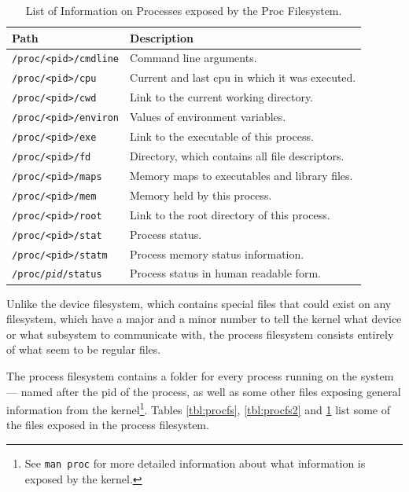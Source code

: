 \documentclass[a4paper]{article}
\begin{document}
\begin{table}
\renewcommand{\arraystretch}{1.25}
\centering
\caption{List of Information on Processes exposed by the Proc Filesystem.}  
\label{tbl:procfs3}
\begin{tabular}{@{}lp{8cm}@{}}
\toprule
Path & Description\\
\midrule
\texttt{/proc/<pid>/cmdline} &
Command line arguments.\\

\texttt{/proc/<pid>/cpu} &
Current and last cpu in which it was executed.\\

\texttt{/proc/<pid>/cwd} &
Link to the current working directory.\\

\texttt{/proc/<pid>/environ} &
Values of environment variables.\\

\texttt{/proc/<pid>/exe} &
Link to the executable of this process.\\

\texttt{/proc/<pid>/fd} &
Directory, which contains all file descriptors.\\

\texttt{/proc/<pid>/maps} &
Memory maps to executables and library files.\\

\texttt{/proc/<pid>/mem} &
Memory held by this process.\\

\texttt{/proc/<pid>/root} &
Link to the root directory of this process.\\

\texttt{/proc/<pid>/stat} &
Process status.\\

\texttt{/proc/<pid>/statm} &
Process memory status information.\\

\texttt{/proc/\emph{pid}/status} &
Process status in human readable form.\\
\bottomrule
\end{tabular}
\end{table}

Unlike the device filesystem, which contains special files that could exist on any filesystem, which have a major and a minor number to tell the kernel what device or what subsystem to communicate with, the process filesystem consists entirely of what seem to be regular files. 

The process filesystem contains a folder for every process running on the system — named after the \gls{pid} of the process, as well as some other files exposing general information from the kernel\footnote{See \texttt{man proc} for more detailed information about what information is exposed by the kernel.}. Tables \ref{tbl:procfs}, \ref{tbl:procfs2} and \ref{tbl:procfs3} list some of the files exposed in the process filesystem.
\end{document}
